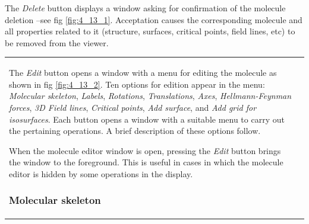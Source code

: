 \documentclass[10pt]{article}
\begin{document}
\vspace*{5mm}


The {\it Delete} button displays a window asking for confirmation 
of the molecule deletion --see fig \ref{fig:4_13_1}. Acceptation causes the corresponding molecule 
and all properties related to it (structure, surfaces, critical points, field lines, etc)
to be removed from the viewer.


\begin{tabular}{lr}
\hspace*{-3mm}
\begin{minipage}{.5\linewidth}

The {\it Edit} button\index{3D graphics!edit molecule} opens a window with a menu for editing the molecule as
shown in fig \ref{fig:4_13_2}. Ten options for edition appear in the menu: 
{\it Molecular skeleton}, {\it Labels}, {\it Rotations},
{\it Translations}, {\it Axes}, {\it Hellmann-Feynman forces},  
{\it 3D Field lines}, {\it Critical points}, {\it Add surface}, and
{\it Add grid for isosurfaces}. Each button opens a window with a suitable menu to
carry out the pertaining operations. A brief description of these options follow.

When the molecule editor window is open, pressing the {\it Edit} button\index{3D graphics!show molecule editor} 
brings the window to the foreground. 
This is useful in cases in which the molecule editor is hidden by some operations in the display.

\subsubsection{Molecular skeleton \label{sec:4.13.1}\index{3D graphics!molecular skeleton}}


\end{minipage}
\end{tabular}
\end{document}
